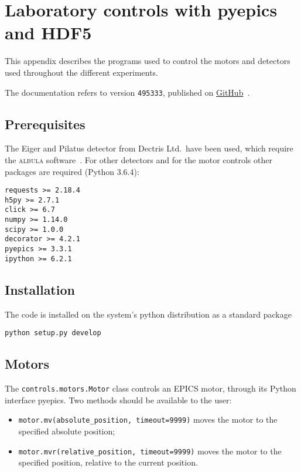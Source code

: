 \chapter{Laboratory controls with pyepics and HDF5}
This appendix describes the programs used to control the motors and
detectors used throughout the different experiments.

The documentation refers to version \texttt{495333}, published on 
\href{https://github.com/Enucatl/python-controls-high-energy/tree/495333d062067ada0331b8c688dd4067832981fc}{GitHub}~\parencite{python-controls-high-energy}.

\section{Prerequisites}
The Eiger and Pilatus detector from Dectris Ltd.\ have been used, which
require the \textsc{albula} software~\parencite{albula}. For other detectors and
for the motor controls other packages are required (Python 3.6.4):
\begin{lstlisting}
requests >= 2.18.4
h5py >= 2.7.1
click >= 6.7
numpy >= 1.14.0
scipy >= 1.0.0
decorator >= 4.2.1
pyepics >= 3.3.1
ipython >= 6.2.1
\end{lstlisting}

\section{Installation}
The code is installed on the system's python distribution as a standard
package
\begin{lstlisting}
python setup.py develop
\end{lstlisting}

\section{Motors}
The \texttt{controls.motors.Motor} class controls an EPICS motor, through
its Python interface pyepics. Two methods should be available to the user:
\begin{itemize}
    \item \verb|motor.mv(absolute_position, timeout=9999)| moves the motor
        to the specified absolute position;
    \item \verb|motor.mvr(relative_position, timeout=9999)| moves the motor
        to the specified position, relative to the current position.
\end{itemize}

